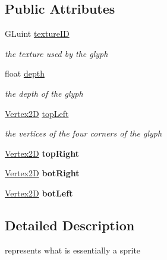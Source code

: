 \subsection*{Public Attributes}
\begin{DoxyCompactItemize}
\item 
\mbox{\label{structnta_1_1Glyph_acd8af1fcb19c4fb960808defbee5abe5}} 
G\+Luint \hyperlink{structnta_1_1Glyph_acd8af1fcb19c4fb960808defbee5abe5}{texture\+ID}
\begin{DoxyCompactList}\small\item\em the texture used by the glyph \end{DoxyCompactList}\item 
\mbox{\label{structnta_1_1Glyph_a259a2061c71dfd9fa0857f52d4daff8a}} 
float \hyperlink{structnta_1_1Glyph_a259a2061c71dfd9fa0857f52d4daff8a}{depth}
\begin{DoxyCompactList}\small\item\em the depth of the glyph \end{DoxyCompactList}\item 
\mbox{\label{structnta_1_1Glyph_a71969ecd8d228e48f9dff95787187282}} 
\hyperlink{structnta_1_1Vertex2D}{Vertex2D} \hyperlink{structnta_1_1Glyph_a71969ecd8d228e48f9dff95787187282}{top\+Left}
\begin{DoxyCompactList}\small\item\em the vertices of the four corners of the glyph \end{DoxyCompactList}\item 
\mbox{\label{structnta_1_1Glyph_a50ce474e9d7b6088e88d991d16f4b047}} 
\hyperlink{structnta_1_1Vertex2D}{Vertex2D} {\bfseries top\+Right}
\item 
\mbox{\label{structnta_1_1Glyph_a5d911b010ab2b67cd4c9e642faf3cbf2}} 
\hyperlink{structnta_1_1Vertex2D}{Vertex2D} {\bfseries bot\+Right}
\item 
\mbox{\label{structnta_1_1Glyph_aba92c1f9cb4d5e17270d90a4f5d19b0b}} 
\hyperlink{structnta_1_1Vertex2D}{Vertex2D} {\bfseries bot\+Left}
\end{DoxyCompactItemize}


\subsection{Detailed Description}
represents what is essentially a sprite 

